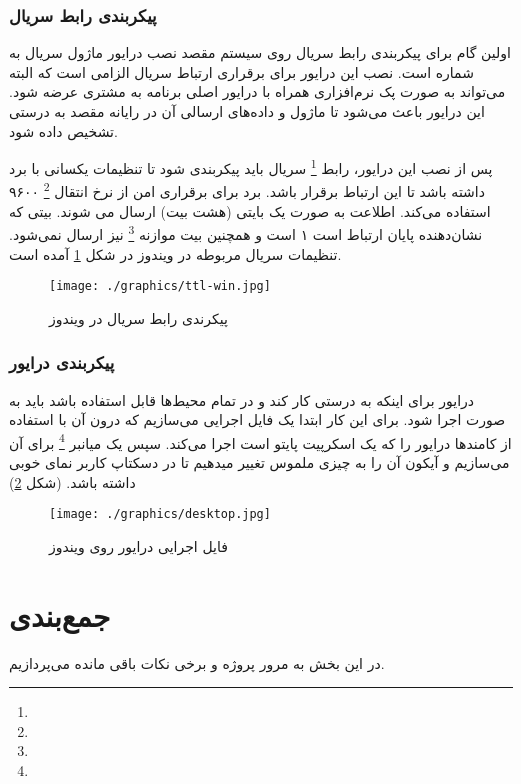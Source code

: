 \documentclass{article}
\begin{document}
\subsubsection{پیکربندی رابط سریال}
اولین گام برای پیکر‌بندی رابط سریال روی سیستم مقصد نصب درایور ماژول سریال به شماره
 \cite{ttl} است. نصب این درایور برای برقراری ارتباط سریال الزامی است که البته می‌تواند
به صورت پک نرم‌افزاری همراه با درایور اصلی برنامه به مشتری عرضه شود. این درایور باعث می‌شود
تا ماژول و داده‌های ارسالی آن در رایانه مقصد به درستی تشخیص داده شود.

پس از نصب این درایور، رابط \footnote{} سریال باید پیکر‌بندی شود تا تنظیمات
یکسانی با برد داشته باشد تا این ارتباط برقرار باشد. برد برای برقراری امن از نرخ انتقال
\footnote{} ۹۶۰۰ استفاده می‌کند. اطلاعت به صورت یک بایتی (هشت بیت) ارسال می شوند. بیتی که نشان‌دهنده پایان ارتباط است ۱ است و همچنین بیت موازنه \footnote{} نیز ارسال نمی‌شود. تنظیمات سریال مربوطه در ویندوز در شکل \ref{ttl-win} آمده است.

\begin{figure}
	\centering
	\texttt{[image: ./graphics/ttl-win.jpg]}
	\caption{پیکرندی رابط سریال در ویندوز}
	\label{ttl-win}
\end{figure}

\subsubsection{پیکربندی درایور}
درایور برای اینکه به درستی کار کند و در تمام محیط‌ها قابل استفاده باشد باید به صورت 
 اجرا شود. برای این کار ابتدا یک فایل اجرایی می‌سازیم که درون آن با استفاده از کامند‌ها درایور را که یک اسکرپیت پایتو است اجرا می‌کند. سپس یک میانبر \footnote{} برای آن می‌سازیم و آیکون آن را به چیزی ملموس تغییر میدهیم تا در دسکتاپ کاربر نمای خوبی داشته باشد. (شکل \ref{desktop})

\begin{figure}
	\centering
	\texttt{[image: ./graphics/desktop.jpg]}
	\caption{فایل اجرایی درایور روی ویندوز}
	\label{desktop}
\end{figure}

\section{جمع‌بندی}
در این بخش به مرور پروژه و برخی نکات باقی مانده می‌پردازیم.
\end{document}
